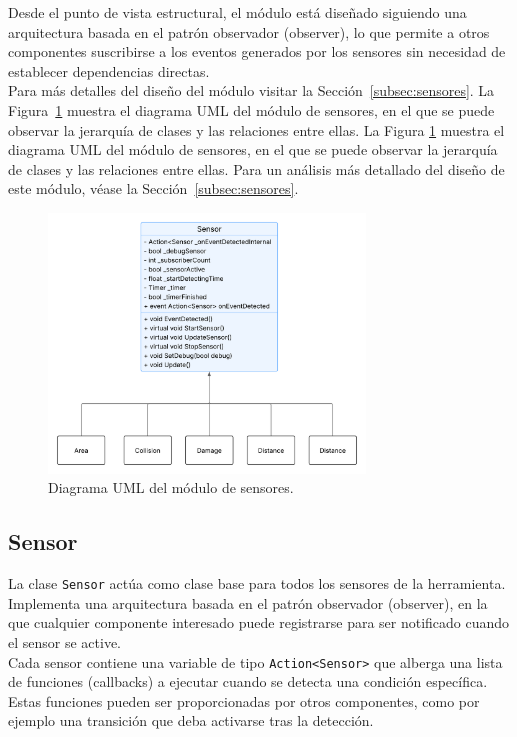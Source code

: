 Desde el punto de vista estructural, el módulo está diseñado siguiendo una arquitectura basada en el patrón observador (observer), lo que permite a otros componentes suscribirse a los eventos generados por los sensores sin necesidad de establecer dependencias directas.\\


Para más detalles del diseño del módulo visitar la Sección~\ref{subsec:sensores}.
La Figura~\ref{fig:UML_SensorModule} muestra el diagrama UML del módulo de sensores, en el que se puede observar la jerarquía de clases y las relaciones entre ellas. 
La Figura \ref{fig:UML_SensorModule} muestra el diagrama UML del módulo de sensores, en el que se puede observar la jerarquía de clases y las relaciones entre ellas. Para un análisis más detallado del diseño de este módulo, véase la Sección~\ref{subsec:sensores}.

\begin{figure}[t]
	\centering
	\includegraphics[width=0.75\textwidth]{Imagenes/UMLSensor.png}
	\caption{Diagrama UML del módulo de sensores.}
	\label{fig:UML_SensorModule}
\end{figure}

\subsection{Sensor}
La clase \texttt{Sensor} actúa como clase base para todos los sensores de la herramienta. Implementa una arquitectura basada en el patrón observador (observer), en la que cualquier componente interesado puede registrarse para ser notificado cuando el sensor se active.\\

Cada sensor contiene una variable de tipo \texttt{Action<Sensor>} que alberga una lista de funciones (callbacks) a ejecutar cuando se detecta una condición específica. Estas funciones pueden ser proporcionadas por otros componentes, como por ejemplo una transición que deba activarse tras la detección.\\

